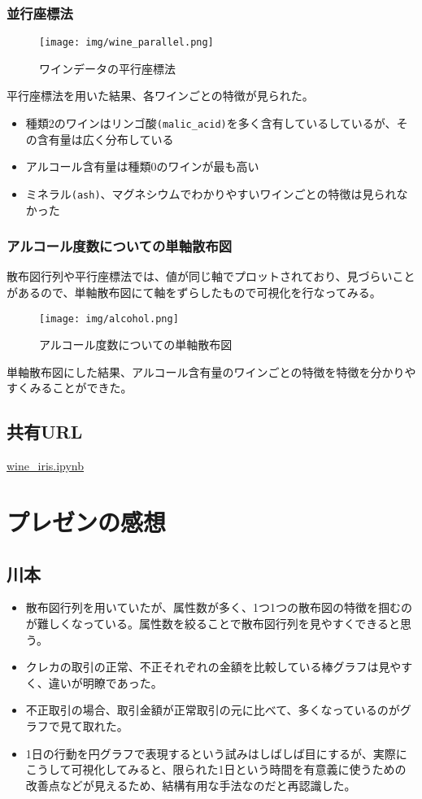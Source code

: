 \documentclass{jsarticle}
\begin{document}
\subsubsection{並行座標法}
\begin{figure}[htbp]
    \begin{center}
        \texttt{[image: img/wine\_parallel.png]}
        \caption{ワインデータの平行座標法}
        \label{fig:wine_parallel.png}
    \end{center}
\end{figure}
平行座標法を用いた結果、各ワインごとの特徴が見られた。
\begin{itemize}
    \item 種類2のワインはリンゴ酸\verb#(malic_acid)#を多く含有しているしているが、その含有量は広く分布している
    \item アルコール含有量は種類0のワインが最も高い
    \item ミネラル\verb#(ash)#、マグネシウムでわかりやすいワインごとの特徴は見られなかった
\end{itemize}
\subsubsection{アルコール度数についての単軸散布図}
散布図行列や平行座標法では、値が同じ軸でプロットされており、見づらいことがあるので、単軸散布図にて軸をずらしたもので可視化を行なってみる。
\begin{figure}[htbp]
    \begin{center}
        \texttt{[image: img/alcohol.png]}
        \caption{アルコール度数についての単軸散布図}
        \label{fig:alcohol}
    \end{center}
\end{figure}
単軸散布図にした結果、アルコール含有量のワインごとの特徴を特徴を分かりやすくみることができた。
\subsection{共有URL}
\href{https://colab.research.google.com/drive/1fGvZuo3kW_uPFLdfFT2vNC8Mj4-_Vjl_?usp=sharing}{wine\_iris.ipynb}
\section{プレゼンの感想}
\subsection*{川本}
\begin{itemize}
    \item 散布図行列を用いていたが、属性数が多く、1つ1つの散布図の特徴を掴むのが難しくなっている。属性数を絞ることで散布図行列を見やすくできると思う。
    \item クレカの取引の正常、不正それぞれの金額を比較している棒グラフは見やすく、違いが明瞭であった。
    \item 不正取引の場合、取引金額が正常取引の元に比べて、多くなっているのがグラフで見て取れた。
    \item 1日の行動を円グラフで表現するという試みはしばしば目にするが、実際にこうして可視化してみると、限られた1日という時間を有意義に使うための改善点などが見えるため、結構有用な手法なのだと再認識した。
\end{itemize}
\end{document}
